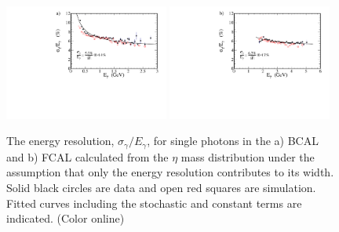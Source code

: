 \begin{figure}[tbh]\centering
\includegraphics[width=0.48\textwidth]{figures/fit_BCAL_energy_resolution_sigma.pdf} \includegraphics[width=0.48\textwidth]{figures/fit_FCAL_energy_resolution_sigma.pdf}
\caption{\label{fig:bcal:eta_resolution} 
The energy resolution, $\sigma_\gamma/E_\gamma$, for single photons in the a) BCAL and b) FCAL calculated from the $\eta$ mass distribution under the assumption that only the energy resolution contributes to its width.  Solid black circles are data and open red squares are simulation. Fitted curves including the stochastic and constant terms are indicated.
(Color online)
 }
\end{figure}    


